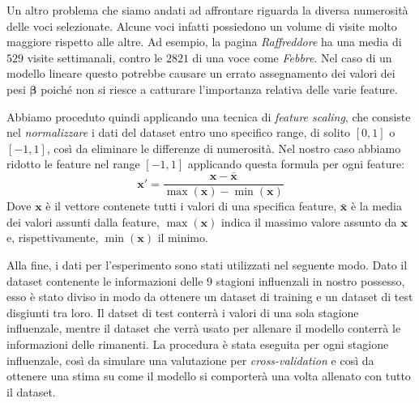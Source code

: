 Un altro problema che siamo andati ad affrontare riguarda la diversa numerosità delle voci selezionate. Alcune voci infatti 
possiedono un volume di visite molto maggiore rispetto alle altre. Ad esempio, la pagina \textit{Raffreddore} ha una media di 
$529$ visite settimanali, contro le $2821$ di una voce come \textit{Febbre}. Nel caso di un modello lineare questo potrebbe 
causare un errato assegnamento dei valori dei pesi $\bm{\beta}$ poiché non si riesce a catturare l'importanza relativa delle 
varie feature.
\bigskip

Abbiamo proceduto quindi applicando una tecnica di \textit{feature scaling}, che consiste nel \textit{normalizzare} i dati 
del dataset entro uno specifico range, di solito $[0, 1]$ o $[-1, 1]$, così da eliminare le differenze di numerosità. Nel 
nostro caso abbiamo ridotto le feature nel range $[-1, 1]$ applicando questa formula per ogni feature:
\begin{equation}
\bm{x}' = \frac{\bm{x}-\bar{\bm{x}}}{\max(\bm{x})-\min(\bm{x})}
\end{equation} 
Dove $\bm{x}$ è il vettore contenete tutti i valori di una specifica feature, $\bar{\bm{x}}$ è la media dei valori assunti dalla feature, $\max(\bm{x})$ indica il massimo valore assunto da $\bm{x}$ e, rispettivamente, $\min(\bm{x})$ il minimo.
\bigskip

Alla fine, i dati per l'esperimento sono stati utilizzati nel seguente modo. Dato il dataset contenente le informazioni 
delle 9 stagioni influenzali in nostro possesso, esso è stato diviso in modo da ottenere un dataset di training e un dataset 
di test disgiunti tra loro. Il datset di test conterrà i valori di una sola stagione influenzale, mentre il dataset che verrà 
usato per allenare il modello conterrà le informazioni delle rimanenti. La procedura è stata eseguita 
per ogni stagione influenzale, così da simulare una valutazione per \textit{cross-validation} e così da ottenere una stima su 
come il modello si comporterà una volta allenato con tutto il dataset.
\bigskip
\newpage
